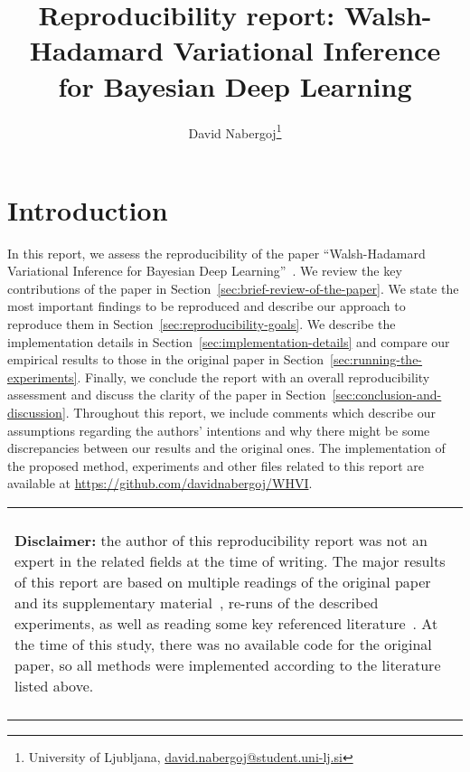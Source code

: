 \documentclass[11pt]{article}
\title{Reproducibility report: Walsh-Hadamard Variational Inference for Bayesian Deep Learning}
\author{David Nabergoj\thanks{University of Ljubljana, \href{mailto:david.nabergoj@student.uni-lj.si}{david.nabergoj@student.uni-lj.si}}}
\newenvironment{disclaimer}
    {
    \begin{center}
    \begin{tabular}{|p{0.9\hsize}|}
    \hline\\
    \begin{footnotesize}\textbf{Disclaimer:}}
    {
    \end{footnotesize}
    \\\\\hline
    \end{tabular}
    \end{center}
    }
\begin{document}
    \maketitle


    \section{Introduction}\label{sec:introduction}
    In this report, we assess the reproducibility of the paper ``Walsh-Hadamard Variational Inference for Bayesian Deep Learning''~\cite{rossi2019walsh}.
    We review the key contributions of the paper in Section~\ref{sec:brief-review-of-the-paper}.
    We state the most important findings to be reproduced and describe our approach to reproduce them in Section~\ref{sec:reproducibility-goals}.
    We describe the implementation details in Section~\ref{sec:implementation-details} and compare our empirical results to those in the original paper in Section~\ref{sec:running-the-experiments}.
    Finally, we conclude the report with an overall reproducibility assessment and discuss the clarity of the paper in Section~\ref{sec:conclusion-and-discussion}.
    Throughout this report, we include comments which describe our assumptions regarding the authors' intentions and why there might be some discrepancies between our results and the original ones.
    The implementation of the proposed method, experiments and other files related to this report are available at \url{https://github.com/davidnabergoj/WHVI}.

    \begin{disclaimer}
    the author of this reproducibility report was not an expert in the related fields at the time of writing.
    The major results of this report are based on multiple readings of the original paper and its supplementary material~\cite{rossi2019walsh}, re-runs of the described experiments, as well as reading some key referenced literature~\cite{le2014fastfood, blundell2015weight, fino1976unified, kingma2015variational}.
    At the time of this study, there was no available code for the original paper, so all methods were implemented according to the literature listed above.
    \end{disclaimer}
\end{document}
